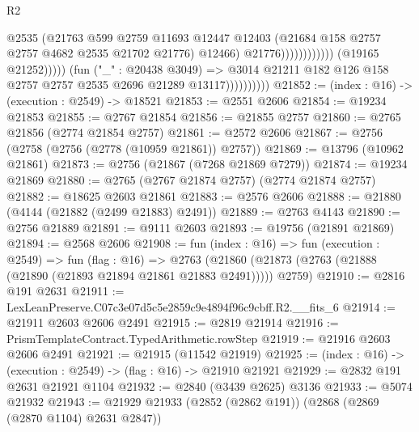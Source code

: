 \begin{lexlean}{R2}
\begin{coremodule}
                                                      @2535
                                                      (@21763
                                                        @599
                                                        @2759
                                                        @11693
                                                        @12447
                                                        @12403
                                                        (@21684
                                                          @158
                                                          @2757
                                                          @2757
                                                          @4682
                                                          @2535
                                                          @21702
                                                          @21776)
                                                        @12466)
                                                      @21776))))))))))))
                              (@19165 @21252)))))
                      (fun ("_" : @20438 @3049) =>
                      @3014 @21211 @182 @126 @158 @2757 @2757 @2535 @2696 @21289 @13117))))))))))
@21852 := (index : @16) -> (execution : @2549) -> @18521
@21853 := @2551 @2606
@21854 := @19234 @21853
@21855 := @2767 @21854
@21856 := @21855 @2757
@21860 := @2765 @21856 (@2774 @21854 @2757)
@21861 := @2572 @2606
@21867 := @2756 (@2758 (@2756 (@2778 (@10959 @21861)) @2757))
@21869 := @13796 (@10962 @21861)
@21873 := @2756 (@21867 (@7268 @21869 @7279))
@21874 := @19234 @21869
@21880 := @2765 (@2767 @21874 @2757) (@2774 @21874 @2757)
@21882 := @18625 @2603 @21861
@21883 := @2576 @2606
@21888 := @21880 (@4144 (@21882 (@2499 @21883) @2491))
@21889 := @2763 @4143
@21890 := @2756 @21889
@21891 := @9111 @2603
@21893 := @19756 (@21891 @21869)
@21894 := @2568 @2606
@21908 := fun (index : @16) =>
  fun (execution : @2549) =>
  fun (flag : @16) =>
  @2763 (@21860 (@21873 (@2763 (@21888 (@21890 (@21893 @21894 @21861 @21883 @2491))))) @2759)
@21910 := @2816 @191 @2631
@21911 := LexLeanPreserve.C07c3e07d5c5e2859c9e4894f96c9cbff.R2.__fits_6
@21914 := @21911 @2603 @2606 @2491
@21915 := @2819 @21914
@21916 := PrismTemplateContract.TypedArithmetic.rowStep
@21919 := @21916 @2603 @2606 @2491
@21921 := @21915 (@11542 @21919)
@21925 := (index : @16) -> (execution : @2549) -> (flag : @16) -> @21910 @21921
@21929 := @2832 @191 @2631 @21921 @1104
@21932 := @2840 (@3439 @2625) @3136
@21933 := @5074 @21932
@21943 := @21929 @21933 (@2852 (@2862 @191)) (@2868 (@2869 (@2870 @1104) @2631 @2847))

\end{coremodule}
\end{lexlean}
